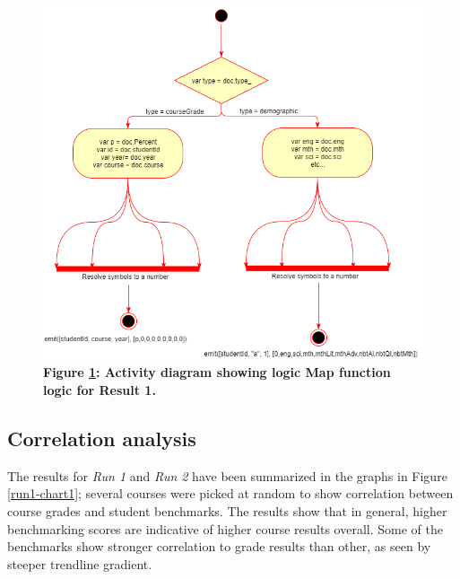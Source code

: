 \begin{figure}[ht]
    \centering
    \begin{mdframed}
        \centering
        \includegraphics[scale=0.35]{./resources/figures/activity-diagram-1.png}
    \end{mdframed}
    \caption[Result 1 Map function]{\textbf{Figure \ref{result-1-map-fn}: Activity diagram showing logic Map function logic for Result 1.} }
    \label{result-1-map-fn}
\end{figure}

\subsection{Correlation analysis}
The results for \textit{Run 1} and \textit{Run 2} have been summarized in the graphs in Figure \ref{run1-chart1}; several courses were picked at random to show correlation between course grades and student benchmarks. The results show that in general, higher benchmarking scores are indicative of higher course results overall. Some of the benchmarks show stronger correlation to grade results than other, as seen by steeper trendline gradient.




